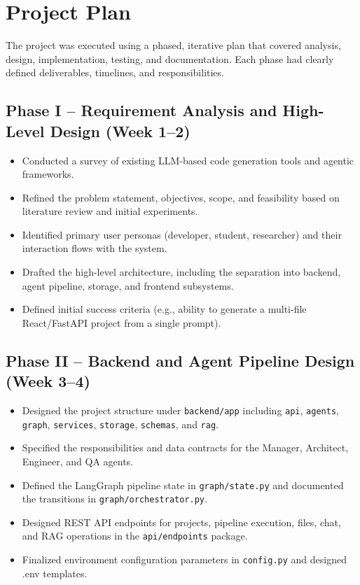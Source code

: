 \section{Project Plan}

The project was executed using a phased, iterative plan that covered analysis, design, implementation, testing, and documentation. Each phase had clearly defined deliverables, timelines, and responsibilities.

\subsection*{Phase I -- Requirement Analysis and High-Level Design (Week 1--2)}
\begin{itemize}
    \item Conducted a survey of existing LLM-based code generation tools and agentic frameworks.
    \item Refined the problem statement, objectives, scope, and feasibility based on literature review and initial experiments.
    \item Identified primary user personas (developer, student, researcher) and their interaction flows with the system.
    \item Drafted the high-level architecture, including the separation into backend, agent pipeline, storage, and frontend subsystems.
    \item Defined initial success criteria (e.g., ability to generate a multi-file React/FastAPI project from a single prompt).
\end{itemize}

\subsection*{Phase II -- Backend and Agent Pipeline Design (Week 3--4)}
\begin{itemize}
    \item Designed the project structure under \texttt{backend/\allowbreak{}app} including \texttt{api}, \texttt{agents}, \texttt{graph}, \texttt{services}, \texttt{storage}, \texttt{schemas}, and \texttt{rag}.
    \item Specified the responsibilities and data contracts for the Manager, Architect, Engineer, and QA agents.
    \item Defined the LangGraph pipeline state in \texttt{graph/\allowbreak{}\allowbreak{}state.py} and documented the transitions in \texttt{graph/\allowbreak{}\allowbreak{}orchestrator.py}.
    \item Designed REST API endpoints for projects, pipeline execution, files, chat, and RAG operations in the \texttt{api/\allowbreak{}\allowbreak{}endpoints} package.
    \item Finalized environment configuration parameters in \texttt{config.py} and designed .env templates.
\end{itemize}

